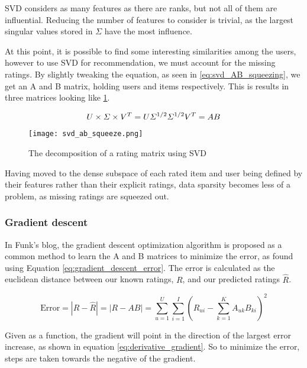 SVD considers as many features as there are ranks, but not all of them are influential. Reducing the number of features to consider is trivial, as the largest singular values stored in $\Sigma$ have the most influence.

At this point, it is possible to find some interesting similarities among the users, however to use SVD for recommendation, we must account for the missing ratings. By slightly tweaking the equation, as seen in \ref{eq:svd_AB_squeezing}, we get an A and B matrix, holding users and items respectively. This is results in three matrices looking like \ref{fig:svd_squeeze}.

\begin{equation}\label{eq:svd_AB_squeezing}
	\centering
	U\times \Sigma \times V^T = U\Sigma^{1/2} \Sigma^{1/2}V^T = AB
\end{equation}

\begin{figure} [H] \label{fig:svd_squeeze}
	\centering
	\texttt{[image: svd\_ab\_squeeze.png]}
	\caption{The decomposition of a rating matrix using SVD}
\end{figure}

Having moved to the dense subspace of each rated item and user being defined by their features rather than their explicit ratings, data sparsity becomes less of a problem, as missing ratings are squeezed out.

\subsubsection{Gradient descent}
In Funk's blog, the gradient descent optimization algorithm is proposed as a common method to learn the A and B matrices to minimize the error, as found using Equation \ref{eq:gradient_descent_error}. The error is calculated as the euclidean distance between our known ratings, $R$, and our predicted ratings $\hat{R}$.

\begin{equation}\label{eq:gradient_descent_error}
\text{Error} = |R-\hat{R}| = |R - AB| = \sum_{u=1}^{U}\sum_{i=1}^{I}\left (R_{ui}- \sum_{k=1}^{K} A_{uk}B_{ki} \right )^2
\end{equation}

Given as a function, the gradient will point in the direction of the largest error increase, as shown in equation \ref{eq:derivative_gradient}. So to minimize the error, steps are taken towards the negative of the gradient.

